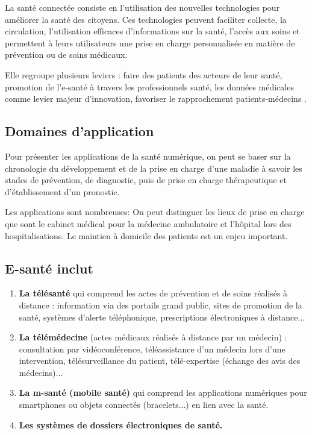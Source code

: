 \documentclass[12pt]{article}
\begin{document}
La santé connectée consiste en l’utilisation des nouvelles technologies pour améliorer la santé des citoyens. Ces technologies peuvent faciliter collecte, la circulation, l'utilisation efficaces d'informations sur la santé, l’accès aux soins et permettent à leurs utilisateurs une prise en charge personnalisée en matière de prévention ou de soins médicaux.

Elle regroupe plusieurs leviers : faire des patients des acteurs de leur santé, promotion de l’e-santé à travers les professionnels santé, les données médicales comme levier majeur d’innovation, favoriser le rapprochement patients-médecins \cite{27}.

\subsection{Domaines d’application}
Pour présenter les applications de la santé numérique, on peut se baser sur la chronologie du développement et de la prise en charge d’une maladie à savoir les stades de prévention, de diagnostic, puis de prise en charge thérapeutique et d’établissement d’un pronostic.

Les applications sont nombreuses: On peut distinguer les lieux de prise en charge que sont le cabinet médical pour la médecine ambulatoire et l’hôpital lors des hospitalisations. Le maintien à domicile des patients est un enjeu important.

\subsection{E-santé inclut}
\begin{enumerate}
	\item \textbf{La télésanté} qui comprend les actes de prévention et de soins réalisés à distance : information via des portails grand public, sites de promotion de la santé, systèmes d'alerte téléphonique, prescriptions électroniques à distance...
	\item \textbf{La télémédecine} (actes médicaux réalisés à distance par un médecin) : consultation par vidéoconférence, téléassistance d'un médecin lors d'une intervention, télésurveillance du patient, télé-expertise (échange des avis des médecins)...
	\item \textbf{La m-santé (mobile santé)} qui comprend les applications numériques pour smartphones ou objets connectés (bracelets...) en lien avec la santé.
	\item \textbf{Les systèmes de dossiers électroniques de santé.}
\end{enumerate}
\end{document}
